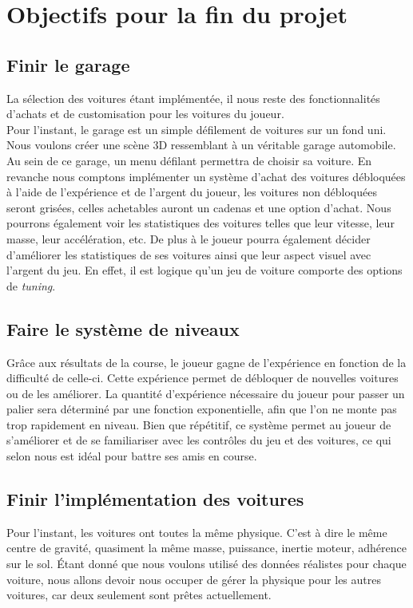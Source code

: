 \documentclass[12pt,a4paper]{article}
\begin{document}
    \clearpage
    \section{Objectifs pour la fin du projet}
        \subsection{Finir le garage}
            La sélection des voitures étant implémentée, il nous reste des fonctionnalités
            d'achats et de customisation pour les voitures du joueur.\\
            Pour l'instant, le garage est un simple défilement de voitures sur un fond uni.
            Nous voulons créer une scène 3D ressemblant à un véritable garage automobile.
            Au sein de ce garage, un menu défilant permettra de choisir sa voiture.
            En revanche nous comptons implémenter un système d'achat des voitures débloquées
            à l'aide de l'expérience et de l'argent du joueur, les voitures non débloquées
            seront grisées, celles achetables auront un cadenas et une option d'achat.
            Nous pourrons également voir les statistiques des voitures telles que leur vitesse,
            leur masse, leur accélération, etc. De plus à le joueur pourra également décider
            d'améliorer les statistiques de ses voitures ainsi que leur aspect visuel avec l'argent
            du jeu. En effet, il est logique qu'un jeu de voiture comporte des options de
            \textsl{tuning}.
        
        \subsection{Faire le système de niveaux}
            Grâce aux résultats de la course, le joueur gagne de l'expérience en fonction de la
            difficulté de celle-ci. Cette expérience permet de débloquer de nouvelles voitures
            ou de les améliorer. La quantité d'expérience nécessaire du joueur pour passer un palier
            sera déterminé par une fonction exponentielle, afin que l'on ne monte pas trop rapidement 
            en niveau. Bien que répétitif, ce système permet au joueur 
            de s'améliorer et de se familiariser avec les contrôles du 
            jeu et des voitures, ce qui selon nous est idéal pour battre ses amis en course.
            
        \subsection{Finir l'implémentation des voitures}
           Pour l'instant, les voitures ont toutes la même physique. C'est à dire le même
           centre de gravité, quasiment la même masse, puissance, inertie moteur, adhérence sur le 
           sol.
           Étant donné que nous voulons utilisé des données réalistes pour chaque voiture,
           nous allons devoir nous occuper de gérer la physique pour les autres voitures,
           car deux seulement sont prêtes actuellement.
            
\end{document}
